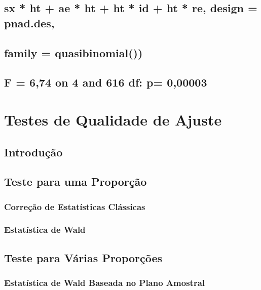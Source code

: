 \documentclass[]{book}
\theoremstyle{definition}
\theoremstyle{definition}
\theoremstyle{definition}
\theoremstyle{remark}
\begin{document}
\section{sx * ht + ae * ht + ht * id + ht * re, design =
pnad.des,}\label{sx-ht-ae-ht-ht-id-ht-re-design-pnad.des}

\section{family = quasibinomial())}\label{family-quasibinomial}

\section{F = 6,74 on 4 and 616 df: p=
0,00003}\label{f-674-on-4-and-616-df-p-000003}

\chapter{Testes de Qualidade de Ajuste}\label{testqualajust}

\section{Introdução}\label{introducao-1}

\section{Teste para uma Proporção}\label{teste-para-uma-proporcao}

\subsection{Correção de Estatísticas
Clássicas}\label{correcao-de-estatisticas-classicas}

\subsection{Estatística de Wald}\label{estatistica-de-wald}

\section{Teste para Várias
Proporções}\label{teste-para-varias-proporcoes}

\subsection{Estatística de Wald Baseada no Plano
Amostral}\label{estatistica-de-wald-baseada-no-plano-amostral}
\end{document}
